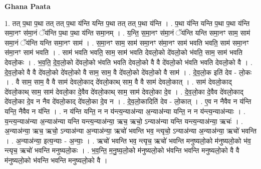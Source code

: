\documentclass[17pt]{extarticle}
\begin{document}
\textbf{Ghana Paata } \newline

1. तत् प॒था प॒था तत् तत् प॒था य॑न्ति यन्ति प॒था तत् तत् प॒था य॑न्ति । . प॒था य॑न्ति यन्ति प॒था प॒था य॑न्ति समा॒नꣳ स॑मा॒नं ॅय॑न्ति प॒था प॒था य॑न्ति समा॒नम् । . य॒न्ति॒ स॒मा॒नꣳ स॑मा॒नं ॅय॑न्ति यन्ति समा॒नꣳ साम॒ साम॑ समा॒नं ॅय॑न्ति यन्ति समा॒नꣳ साम॑ । . स॒मा॒नꣳ साम॒ साम॑ समा॒नꣳ स॑मा॒नꣳ साम॑ भवति भवति॒ साम॑ समा॒नꣳ स॑मा॒नꣳ साम॑ भवति । . साम॑ भवति भवति॒ साम॒ साम॑ भवति देवलो॒को दे॑वलो॒को भ॑वति॒ साम॒ साम॑ भवति देवलो॒कः । . भ॒व॒ति॒ दे॒व॒लो॒को दे॑वलो॒को भ॑वति भवति देवलो॒को वै वै दे॑वलो॒को भ॑वति भवति देवलो॒को वै । . दे॒व॒लो॒को वै वै दे॑वलो॒को दे॑वलो॒को वै साम॒ साम॒ वै दे॑वलो॒को दे॑वलो॒को वै साम॑ । . दे॒व॒लो॒क इति॑ देव - लो॒कः । . वै साम॒ साम॒ वै वै साम॑ देवलो॒काद् दे॑वलो॒काथ् साम॒ वै वै साम॑ देवलो॒कात् । . साम॑ देवलो॒काद् दे॑वलो॒काथ् साम॒ साम॑ देवलो॒का दे॒वैव दे॑वलो॒काथ् साम॒ साम॑ देवलो॒का दे॒व । . दे॒व॒लो॒का दे॒वैव दे॑वलो॒काद् दे॑वलो॒का दे॒व न नैव दे॑वलो॒काद् दे॑वलो॒का दे॒व न । . दे॒व॒लो॒कादिति॑ देव - लो॒कात् । . ए॒व न नैवैव न य॑न्ति यन्ति॒ नैवैव न य॑न्ति । . न य॑न्ति यन्ति॒ न न य॑न्त्य॒न्याअ॑न्या अ॒न्याअ॑न्या यन्ति॒ न न य॑न्त्य॒न्याअ॑न्याः । . य॒न्त्य॒न्याअ॑न्या अ॒न्याअ॑न्या यन्ति यन्त्य॒न्याअ॑न्या॒ ऋच॒ ऋचो॒ ऽन्याअ॑न्या यन्ति यन्त्य॒न्याअ॑न्या॒ ऋचः॑ । . अ॒न्याअ॑न्या॒ ऋच॒ ऋचो॒ ऽन्याअ॑न्या अ॒न्याअ॑न्या॒ ऋचो॑ भवन्ति भव॒ न्त्यृचो॒ ऽन्याअ॑न्या अ॒न्याअ॑न्या॒ ऋचो॑ भवन्ति । . अ॒न्याअ॑न्या॒ इत्य॒न्याः - अ॒न्याः॒ । . ऋचो॑ भवन्ति भव॒ न्त्यृच॒ ऋचो॑ भवन्ति मनुष्यलो॒को म॑नुष्यलो॒को भ॑व॒ न्त्यृच॒ ऋचो॑ भवन्ति मनुष्यलो॒कः । . भ॒व॒न्ति॒ म॒नु॒ष्य॒लो॒को म॑नुष्यलो॒को भ॑वन्ति भवन्ति मनुष्यलो॒को वै वै म॑नुष्यलो॒को भ॑वन्ति भवन्ति मनुष्यलो॒को वै । \newline
\end{document}
